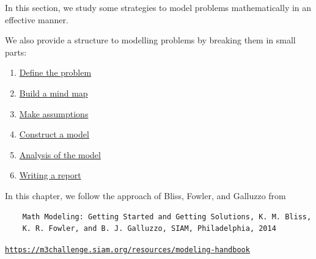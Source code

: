 
%
%


\begin{topic}

\label{chap1}
In this section, we study some strategies to model problems mathematically in an effective manner.

We also provide a structure to modelling problems by breaking them in small parts:

\begin{enumerate}[label={\bf \arabic*.}]
	\item \hyperref[define]{Define the problem}
	\item \hyperref[mindmap]{Build a mind map}
	\item \hyperref[assumption]{Make assumptions}
	\item \hyperref[model]{Construct a model}
	\item \hyperref[analysis]{Analysis of the model}
	\item \hyperref[report]{Writing a report}
\end{enumerate}

\vspace{2cm}

In this chapter, we follow the approach of Bliss, Fowler, and Galluzzo from
\begin{graybox}
\begin{minipage}{.75\textwidth}
\begin{verbatim}
	Math Modeling: Getting Started and Getting Solutions, K. M. Bliss, 
	K. R. Fowler, and B. J. Galluzzo, SIAM, Philadelphia, 2014
\end{verbatim}
\begin{center}
\href{https://m3challenge.siam.org/resources/modeling-handbook}{\tt https://m3challenge.siam.org/resources/modeling-handbook}
\end{center}
\end{minipage}
\hfill
\begin{minipage}{.20\textwidth}
	\hfill{}	
\end{minipage}
\end{graybox}


\vfill



\end{topic}
